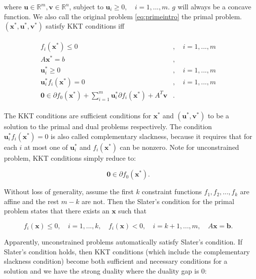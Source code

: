 where $\boldsymbol u\in\mathbb{R}^m,\boldsymbol v\in\mathbb{R}^n$, subject to $\boldsymbol u_i\geq 0,\quad i=1,...,m$. $g$ will always be a concave function. We also call the original problem \eqref{eq:primeintro} the primal problem. $(\boldsymbol x^*,\boldsymbol u^*,\boldsymbol v^*)$ satisfy KKT conditions iff

\begin{gather}
    \begin{aligned}
        f_i(\boldsymbol x^*)\leq 0&,\quad i=1,...,m\\
        A\boldsymbol x^*=b&,\\
        \boldsymbol u^*_i\geq 0&,\quad i=1,...,m\\
        \boldsymbol u^*_i f_i(\boldsymbol x^*)=0&,\quad i=1,...,m\\
        \boldsymbol 0\in \partial f_0(\boldsymbol x^*)+\sum_{i=1}^m \boldsymbol u_i^*\partial f_i(\boldsymbol x^*)+A^T\boldsymbol v&.
    \end{aligned}
\end{gather}

The KKT conditions are sufficient conditions for $\boldsymbol x^*$ and $(\boldsymbol u^*,\boldsymbol v^*)$ to be a solution to the primal and dual problems respectively. The condition $\boldsymbol u_i^*f_i(\boldsymbol x^*)=0$ is also called complementary slackness, because it requires that for each $i$ at most one of $\boldsymbol u_i^*$ and $f_i(\boldsymbol x^*)$ can be nonzero. Note for unconstrained problem, KKT conditions simply reduce to:

\begin{equation}
    \boldsymbol 0\in \partial f_0(\boldsymbol x^*).
\end{equation}

Without loss of generality, assume the first $k$ constraint functions $f_1,f_2,...,f_k$ are affine and the rest $m-k$ are not. Then the Slater's condition for the primal problem states that there exists an $\boldsymbol x$ such that

\begin{equation}
    f_i(\boldsymbol x)\leq 0,\quad i=1,...,k,\quad f_i(\boldsymbol x)<0,\quad i=k+1,...,m,\quad A\boldsymbol x= \boldsymbol b.
\end{equation}

Apparently, unconstrained problems automatically satisfy Slater's condition. If Slater's condition holds, then KKT conditions (which include the complementary slackness condition) become both sufficient and necessary conditions for a solution and we have the strong duality where the duality gap is 0:

